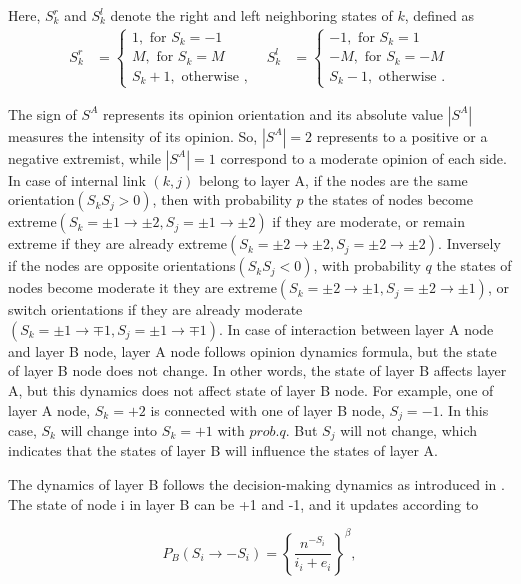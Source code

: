 \documentclass[english]{cccconf}
\begin{document}
Here, $S_k^r$ and $S_k^l$ denote the right and left neighboring states of $k$, defined as
\begin{align*}
S_k^r &= \left\{\begin{matrix}
1,\mbox{ for } S_k= -1
\\ M,\mbox{ for } S_k=M
\\ S_k + 1,\mbox{ otherwise }, 
\end{matrix}\right. &
S_k^l &= \left\{\begin{matrix}
-1,\mbox{ for } S_k= 1
\\ -M,\mbox{ for } S_k=-M
\\ S_k - 1,\mbox{ otherwise }.
\end{matrix}\right.
\end{align*}


The sign of $S^A$ represents its opinion orientation and its absolute value $|S^A|$ measures the intensity of its opinion. So, $|S^A|=2$ represents to a positive or a negative extremist, while  $|S^A|=1$ correspond to a moderate opinion of each side. In case of internal link $(k, j)$ belong to layer A, if the nodes are the same orientation$(S_kS_j>0)$, then with probability $p$ the states of nodes become extreme$(S_k=\pm1 \rightarrow \pm2, S_j= \pm1 \rightarrow \pm2)$ if they are moderate, or remain extreme if they are already extreme$(S_k=\pm2 \rightarrow \pm2, S_j= \pm2 \rightarrow \pm2)$. Inversely if the nodes are opposite orientations$(S_kS_j<0)$, with probability $q$ the states of nodes become moderate it they are extreme$(S_k=\pm2 \rightarrow \pm1, S_j= \pm2 \rightarrow \pm1)$, or switch orientations if they are already moderate$(S_k=\pm1 \rightarrow \mp1, S_j= \pm1 \rightarrow \mp1)$.  In case of interaction between layer A node and layer B node, layer A node follows opinion dynamics formula, but the state of layer B node does not change. In other words, the state of layer B affects layer A, but this dynamics does not affect state of layer B node. For example, one of layer A node, $S_k = +2$ is connected with one of layer B node, $S_j = -1$. In this case, $S_k$ will change into $S_k = +1$ with $prob.q$. But $S_j$ will not change, which indicates that the states of layer B will influence the states of layer A.

The dynamics of layer B follows the decision-making dynamics as introduced in \cite{abrams2003, vazquez2010}. The state of node i in layer B can be +1 and -1, and it updates according to

\begin{equation}
P_B(S_i \rightarrow -S_i)= \left \{\frac{n^{-S_i}}{i_i + e_i}\right \}^\beta,
\end{equation}
\end{document}
